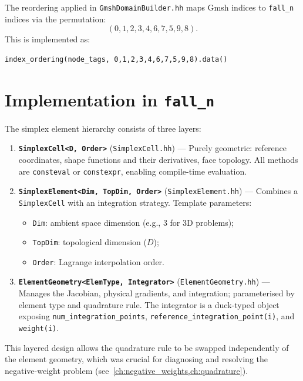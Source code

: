 The reordering applied in \texttt{GmshDomainBuilder.hh} maps Gmsh indices to
\texttt{fall\_n} indices via the permutation:
\begin{equation}
  (0, 1, 2, 3, 4, 6, 7, 5, 9, 8).
  \label{eq:gmsh_perm}
\end{equation}
This is implemented as:
\begin{lstlisting}
index_ordering(node_tags, 0,1,2,3,4,6,7,5,9,8).data()
\end{lstlisting}


\section{Implementation in \texttt{fall\_n}}
\label{sec:simplex_impl}

The simplex element hierarchy consists of three layers:

\begin{enumerate}[leftmargin=2em]
  \item \textbf{\texttt{SimplexCell<D, Order>}} (\texttt{SimplexCell.hh}) ---
        Purely geometric: reference coordinates, shape functions and their
        derivatives, face topology.  All methods are \texttt{consteval} or
        \texttt{constexpr}, enabling compile-time evaluation.

  \item \textbf{\texttt{SimplexElement<Dim, TopDim, Order>}}
        (\texttt{SimplexElement.hh}) --- Combines a \texttt{SimplexCell} with
        an integration strategy.  Template parameters:
        \begin{itemize}[nosep]
          \item \texttt{Dim}: ambient space dimension (e.g., 3 for 3D problems);
          \item \texttt{TopDim}: topological dimension ($D$);
          \item \texttt{Order}: Lagrange interpolation order.
        \end{itemize}

  \item \textbf{\texttt{ElementGeometry<ElemType, Integrator>}}
        (\texttt{ElementGeometry.hh}) --- Manages the Jacobian, physical
        gradients, and integration; parameterised by element type and
        quadrature rule.  The integrator is a duck-typed object exposing
        \texttt{num\_integration\_points}, \texttt{reference\_integration\_point(i)},
        and \texttt{weight(i)}.
\end{enumerate}

This layered design allows the quadrature rule to be swapped independently of
the element geometry, which was crucial for diagnosing and resolving the
negative-weight problem (see~\cref{ch:negative_weights,ch:quadrature}).
